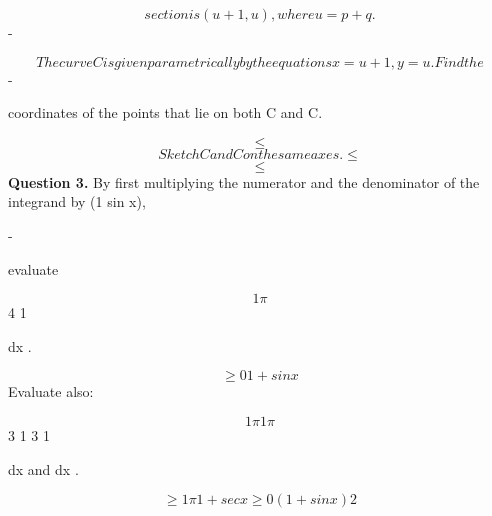 \documentclass[12pt]{article}
\begin{document}
\begin{flushleft}
\[section is (u + 1 , u), where u = p + q.\]
-\par
\[The curve C is given parametrically by the equations x = u + 1, y = u. Find the\]
-\par
coordinates of the points that lie on both C and C.\par
\[\leq\]
\[Sketch C and C on the same axes. \leq\]
\[\leq\]
\bigskip\textbf{Question 3.} By first multiplying the numerator and the denominator of the integrand by (1 sin x),\par
-\par
evaluate\par
\[1 \pi\]
4 1\par
dx .\par
\[\geq0 1 + sin x\]
Evaluate also:\par
\[1 \pi 1 \pi\]
3 1 3 1\par
dx and dx .\par
\[\geq 1 \pi 1 + sec x \geq0 (1 + sin x)2\]
\end{flushleft}
\end{document}

